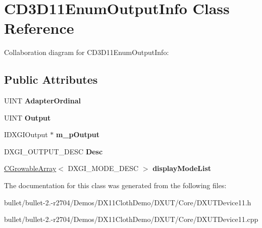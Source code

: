 \hypertarget{class_c_d3_d11_enum_output_info}{\section{C\+D3\+D11\+Enum\+Output\+Info Class Reference}
\label{class_c_d3_d11_enum_output_info}
}


Collaboration diagram for C\+D3\+D11\+Enum\+Output\+Info\+:
\subsection*{Public Attributes}
\begin{DoxyCompactItemize}
\item 
\hypertarget{class_c_d3_d11_enum_output_info_acc33dd940e789b58fc4c6ef80fa7b2fd}{U\+I\+N\+T {\bfseries Adapter\+Ordinal}}\label{class_c_d3_d11_enum_output_info_acc33dd940e789b58fc4c6ef80fa7b2fd}

\item 
\hypertarget{class_c_d3_d11_enum_output_info_a0d90ee9a058e3fbc1e5371ad45f2e3be}{U\+I\+N\+T {\bfseries Output}}\label{class_c_d3_d11_enum_output_info_a0d90ee9a058e3fbc1e5371ad45f2e3be}

\item 
\hypertarget{class_c_d3_d11_enum_output_info_af5f98dd2b1f8b56a3455133f8eb6594f}{I\+D\+X\+G\+I\+Output $\ast$ {\bfseries m\+\_\+p\+Output}}\label{class_c_d3_d11_enum_output_info_af5f98dd2b1f8b56a3455133f8eb6594f}

\item 
\hypertarget{class_c_d3_d11_enum_output_info_ad820d6ea759ed51ccb53e2e4c8de55d6}{D\+X\+G\+I\+\_\+\+O\+U\+T\+P\+U\+T\+\_\+\+D\+E\+S\+C {\bfseries Desc}}\label{class_c_d3_d11_enum_output_info_ad820d6ea759ed51ccb53e2e4c8de55d6}

\item 
\hypertarget{class_c_d3_d11_enum_output_info_a66af1ccbb76f4b95d20ae8d90a96a926}{\hyperlink{class_c_growable_array}{C\+Growable\+Array}$<$ D\+X\+G\+I\+\_\+\+M\+O\+D\+E\+\_\+\+D\+E\+S\+C $>$ {\bfseries display\+Mode\+List}}\label{class_c_d3_d11_enum_output_info_a66af1ccbb76f4b95d20ae8d90a96a926}

\end{DoxyCompactItemize}


The documentation for this class was generated from the following files\+:\begin{DoxyCompactItemize}
\item 
bullet/bullet-\/2.-\/r2704/\+Demos/\+D\+X11\+Cloth\+Demo/\+D\+X\+U\+T/\+Core/D\+X\+U\+T\+Device11.\+h\item 
bullet/bullet-\/2.-\/r2704/\+Demos/\+D\+X11\+Cloth\+Demo/\+D\+X\+U\+T/\+Core/D\+X\+U\+T\+Device11.\+cpp\end{DoxyCompactItemize}
